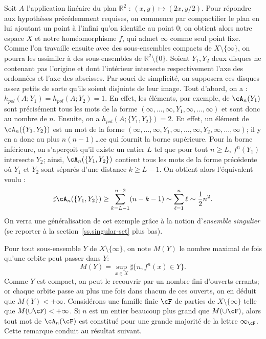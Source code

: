 \begin{exam*}
Soit $A$ {l'application linéaire} du plan $\mathbb R^2$ : $(x,y) \mapsto (2x, y/2)$. Pour répondre aux hypothèses précédemment requises, on commence par compactifier le plan en lui ajoutant un point à l'infini qu'on identifie au point $0$; on obtient alors notre espace $X$ et notre homéomorphisme $f$, qui admet $\infty$ comme seul point fixe. Comme l'on travaille ensuite avec des sous-ensembles compacts de $X\setminus \{\infty\}$, on pourra les assimiler à des sous-ensembles de $\mathbb R ^2 \setminus \{0\}$. Soient $Y_1, Y_2$ deux disques ne contenant pas l'origine et dont l'intérieur intersecte respectivement l'axe des ordonnées et l'axe des abscisses. Par souci de simplicité, on supposera ces disques assez petits de sorte qu'ils soient disjoints de leur image. Tout d'abord, on a : $h_{pol}(A;Y_1)=h_{pol}(A;Y_2)=1$. En effet, les éléments, par exemple, de $\cA_n(Y_1)$ sont précisément tous les mots de la forme $(\infty, \dots, \infty, Y_1, \infty, \dots, \infty)$ et sont donc au nombre de $n$. Ensuite, on a $h_{pol}(A;\{Y_1, Y_2\})=2$. En effet, un élément de $\cA_n(\{Y_1, Y_2\})$ est un mot de la forme $(\infty, \dots, \infty, Y_1, \infty, \dots, \infty, Y_2, \infty, \dots, \infty)$; il y en a donc au plus $n(n-1)$\dots ce qui fournit la borne supérieure. Pour la borne inférieure, on s'aperçoit qu'il existe un entier $L$ tel que pour tout $n \geq L$, $f^n(Y_1)$ intersecte $Y_2$; ainsi, $\cA_n(\{Y_1, Y_2\})$ contient tous les mots de la forme précédente où $Y_1$ et $Y_2$ sont séparés d'une distance $k \geq L-1$. On obtient alors l'équivalent voulu :
\[
\sharp \cA_n(\{Y_1, Y_2\}) \geq \sum_{k=L-1}^{n-2} (n-k-1) \sim \sum_{\ell=1}^n \ell \sim \frac{1}{2} n^2.
\]
On verra une généralisation de cet exemple grâce à la notion d'\textit{ensemble singulier} (se reporter à la section~\ref{ss.singular-set} plus bas).
\end{exam*}



Pour tout sous-ensemble $Y$ de $X\setminus \{\infty\}$, on note $M(Y)$ le nombre maximal de fois qu'une orbite peut passer dans $Y$:
\[
M(Y) = \sup_{x \in X} \sharp \{n, f^n(x) \in Y \}.
\]
Comme $Y$ est compact, on peut le recouvrir par un nombre fini d'ouverts errants; or chaque orbite passe au plus une fois dans chacun de ces ouverts, on en déduit que $M(Y) < +\infty$. Considérons une famille finie $\cF$ de parties de $X\setminus \{\infty\}$ telle que $M(\cup \cF) < +\infty$. Si $n$ est un entier beaucoup plus grand que $M(\cup \cF)$, alors tout mot de $\cA_n(\cF)$ est constitué pour une grande majorité de la lettre $\infty_\cF$. Cette remarque conduit au résultat suivant.

